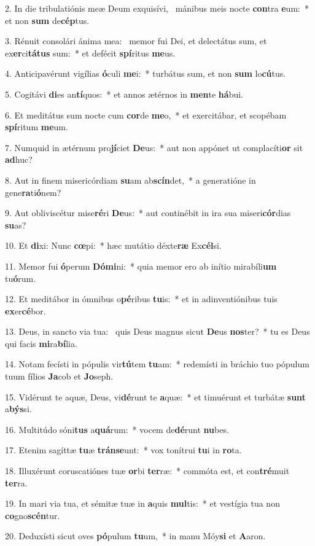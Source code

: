 2. In die tribulatiónis meæ Deum exquisívi, \dag\  mánibus meis nocte \textbf{con}tra \textbf{e}um:~*  et non \textbf{sum} de\textbf{cép}tus.\

3. Rénuit consolári ánima mea: \dag\  memor fui Dei, et delectátus sum, et ex\textbf{er}ci\textbf{tá}\textbf{tus} sum:~*  et defécit \textbf{spí}ritus \textbf{me}us.\

4. Anticipavérunt vigílias \textbf{ó}culi \textbf{me}i:~*  turbátus sum, et non \textbf{sum} lo\textbf{cú}tus.\

5. Cogitávi \textbf{di}es an\textbf{tí}quos:~*  et annos ætérnos in \textbf{men}te \textbf{há}bui.\

6. Et meditátus sum nocte cum \textbf{cor}de \textbf{me}o,~*  et exercitábar, et scopébam \textbf{spí}ritum \textbf{me}um.\

7. Numquid in ætérnum pro\textbf{jí}ciet \textbf{De}us:~*  aut non appónet ut complacíti\textbf{or} sit \textbf{ad}huc?\

8. Aut in finem misericórdiam \textbf{su}am ab\textbf{scín}det,~*  a generatióne in gene\textbf{ra}ti\textbf{ó}nem?\

9. Aut obliviscétur mise\textbf{ré}ri \textbf{De}us:~*  aut continébit in ira sua miseri\textbf{cór}dias \textbf{su}as?\

10. Et \textbf{di}xi: Nunc \textbf{cœ}pi:~*  hæc mutátio déxte\textbf{ræ} Ex\textbf{cél}si.\

11. Memor fui \textbf{ó}perum \textbf{Dó}\textbf{mi}ni:~*  quia memor ero ab inítio mirabíli\textbf{um} tu\textbf{ó}rum.\

12. Et meditábor in ómnibus o\textbf{pé}ribus \textbf{tu}is:~*  et in adinventiónibus tuis \textbf{ex}er\textbf{cé}bor.\

13. Deus, in sancto via tua: \dag\  quis Deus magnus sicut \textbf{De}us \textbf{nos}ter?~*  tu es Deus qui facis \textbf{mi}ra\textbf{bí}lia.\

14. Notam fecísti in pópulis vir\textbf{tú}tem \textbf{tu}am:~*  redemísti in bráchio tuo pópulum tuum fílios \textbf{Ja}cob et \textbf{Jo}seph.\

15. Vidérunt te aquæ, Deus, vi\textbf{dé}runt te \textbf{a}quæ:~*  et timuérunt et turbátæ \textbf{sunt} a\textbf{býs}si.\

16. Multitúdo sóni\textbf{tus} a\textbf{quá}rum:~*  vocem de\textbf{dé}runt \textbf{nu}bes.\

17. Etenim sagíttæ \textbf{tu}æ \textbf{tráns}\textbf{e}unt:~*  vox tonítrui \textbf{tu}i in \textbf{ro}ta.\

18. Illuxérunt coruscatiónes tuæ \textbf{or}bi \textbf{ter}ræ:~*  commóta est, et con\textbf{tré}muit \textbf{ter}ra.\

19. In mari via tua, et sémitæ tuæ in \textbf{a}quis \textbf{mul}tis:~*  et vestígia tua non \textbf{co}gno\textbf{scén}tur.\

20. Deduxísti sicut oves \textbf{pó}pulum \textbf{tu}um,~*  in manu Móy\textbf{si} et \textbf{A}aron.\

